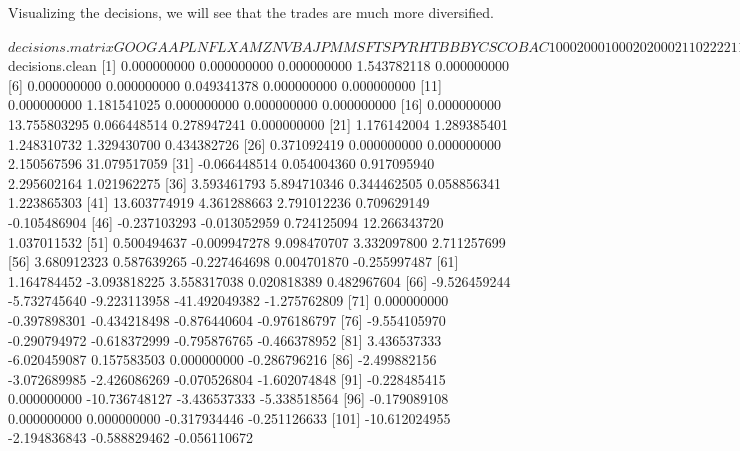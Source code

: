 \documentclass{article}
\begin{document}
Visualizing the decisions, we will see that the trades are much more diversified.

\begin{Schunk}
\begin{Soutput}
$decisions.matrix
  GOOG AAPL NFLX AMZN  V BA JPM MSFT SPY RHT BBBY CSCO BAC
1    0    0    0    2  0  0   0    1   0   0    0    2   0
2    0    0    0    2  1  1   0    2   2   2    2    1   1
3    0    0    2    2 -1  1   1    2   2   2    2    1   1
4    2    2    2    2  1 -1  -1   -1   1   2    2    1  -1
5    2    2    2    2  1 -1   1   -1   2  -2    2    1   1
6   -2   -2   -2   -2 -2  0  -1   -1  -1  -1   -2   -1  -1
7   -1   -1    2   -2  1  0  -1   -2  -2  -2   -1   -2  -1
8    0   -2   -2   -2 -1  0   0   -1  -1  -2   -2   -1  -1

$decisions.clean
  [1]   0.000000000   0.000000000   0.000000000   1.543782118   0.000000000
  [6]   0.000000000   0.000000000   0.049341378   0.000000000   0.000000000
 [11]   0.000000000   1.181541025   0.000000000   0.000000000   0.000000000
 [16]   0.000000000  13.755803295   0.066448514   0.278947241   0.000000000
 [21]   1.176142004   1.289385401   1.248310732   1.329430700   0.434382726
 [26]   0.371092419   0.000000000   0.000000000   2.150567596  31.079517059
 [31]  -0.066448514   0.054004360   0.917095940   2.295602164   1.021962275
 [36]   3.593461793   5.894710346   0.344462505   0.058856341   1.223865303
 [41]  13.603774919   4.361288663   2.791012236   0.709629149  -0.105486904
 [46]  -0.237103293  -0.013052959   0.724125094  12.266343720   1.037011532
 [51]   0.500494637  -0.009947278   9.098470707   3.332097800   2.711257699
 [56]   3.680912323   0.587639265  -0.227464698   0.004701870  -0.255997487
 [61]   1.164784452  -3.093818225   3.558317038   0.020818389   0.482967604
 [66]  -9.526459244  -5.732745640  -9.223113958 -41.492049382  -1.275762809
 [71]   0.000000000  -0.397898301  -0.434218498  -0.876440604  -0.976186797
 [76]  -9.554105970  -0.290794972  -0.618372999  -0.795876765  -0.466378952
 [81]   3.436537333  -6.020459087   0.157583503   0.000000000  -0.286796216
 [86]  -2.499882156  -3.072689985  -2.426086269  -0.070526804  -1.602074848
 [91]  -0.228485415   0.000000000 -10.736748127  -3.436537333  -5.338518564
 [96]  -0.179089108   0.000000000   0.000000000  -0.317934446  -0.251126633
[101] -10.612024955  -2.194836843  -0.588829462  -0.056110672
\end{Soutput}
\end{Schunk}
\end{document}
